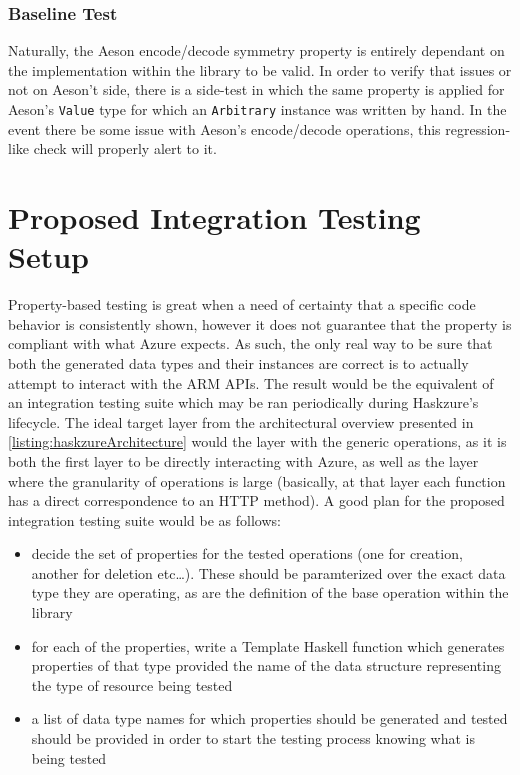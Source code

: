 \documentclass[11pt]{report}
\begin{document}
\subsubsection{Baseline Test}

Naturally, the Aeson encode/decode symmetry property is entirely dependant on
the implementation within the library to be valid. In order to verify that
issues or not on Aeson't side, there is a side-test in which the same property
is applied for Aeson's \texttt{Value} type for which an \texttt{Arbitrary}
instance was written by hand. In the event there be some issue with Aeson's
encode/decode operations, this regression-like check will properly alert to it.

\section{Proposed Integration Testing Setup}

Property-based testing is great when a need of certainty that a specific
code behavior is consistently shown, however it does not guarantee that the
property is compliant with what Azure expects. As such, the only real way to
be sure that both the generated data types and their instances are correct is
to actually attempt to interact with the ARM APIs. \newline
The result would be the equivalent of an integration testing suite which may be
ran periodically during Haskzure's lifecycle. The ideal target layer from the
architectural overview presented in \autoref{listing:haskzureArchitecture}
would the layer with the generic operations, as it is both the first layer to
be directly interacting with Azure, as well as the layer where the granularity
of operations is large (basically, at that layer each function has a direct
correspondence to an HTTP method). \newline
A good plan for the proposed integration testing suite would be as follows:

\begin{itemize}
    \item{} decide the set of properties for the tested operations (one for
        creation, another for deletion etc\ldots). These should be paramterized
        over the exact data type they are operating, as are the definition of
        the base operation within the library
    \item{} for each of the properties, write a Template Haskell function which
        generates properties of that type provided the name of the
        data structure representing the type of resource being tested
    \item{} a list of data type names for which properties should be
        generated and tested should be provided in order to start the testing
        process knowing what is being tested
\end{itemize}
\end{document}
